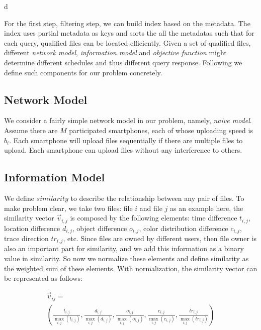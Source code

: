 d\documentclass[letterpaper]{sig-alternate-10pt}
\begin{document}
For the first step, filtering step, we can build index based on the metadata. The index uses partial metadata as keys and sorts the all the metadatas such that for each query, qualified files can be located efficiently. Given a set of qualified files, different \emph{network model}, \emph{information model} and \emph{objective function} might determine different schedules and thus different query response. Following we define such components for our problem concretely.

\subsection{Network Model}
We consider a fairly simple network model in our problem, namely, \emph{naive model}. Assume there are $M$ participated smartphones, each of whose uploading speed is $b_{i}$. Each smartphone will upload files sequentially if there are multiple files to upload.
Each smartphone can upload files without any interference to others.

\subsection{Information Model}

We define ${similarity}$ to describe the relationship between any pair of files. To make problem clear, we take two files: file $i$ and file $j$ as an example here, the similarity vector ${\overrightarrow{v}_{i,j}}$ is composed by the following elements: time difference ${t_{i,j}}$, location difference ${d_{i,j}}$, object difference ${o_{i,j}}$, color distribution difference ${c_{i,j}}$, trace direction ${tr_{i,j}}$, etc. Since files are owned by different users, then file owner is also an important part for similarity, and we add this information as a binary value in similarity. So now we normalize these elements and define similarity as the weighted sum of these elements. With normalization, the similarity vector can be represented as follows:

 \begin{equation}
\begin{array}{l}
 {\overrightarrow{v}_{ij}} =  \\
 \left( {\frac{{{t_{i,j}}}}{{\mathop {\max }\limits_{i,j} \left( {{t_{i,j}}} \right)}},\frac{{{d_{i,j}}}}{{\mathop {\max }\limits_{i,j} \left( {{d_{i,j}}} \right)}},\frac{{{o_{i,j}}}}{{\mathop {\max }\limits_{i,j} \left( {{o_{i,j}}} \right)}},\frac{{{c_{i,j}}}}{{\mathop {\max }\limits_{i,j} \left( {{c_{i,j}}} \right)}},\frac{{t{r_{i,j}}}}{{\mathop {\max }\limits_{i,j} \left( {t{r_{i,j}}} \right)}}} \right) \\
 \end{array}
 \end{equation}
\end{document}
